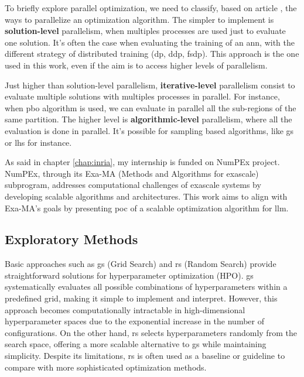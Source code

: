 To briefly explore parallel optimization, we need to classify, based on article \cite{kacprzyk_parallel_2015}, the ways to parallelize an optimization algorithm. The simpler to implement is \textbf{solution-level} parallelism, when multiples processes are used just to evaluate one solution. It's often the case when evaluating the training of an \acrshort{ann}, with the different strategy of distributed training (\acrfull{dp}, \acrfull{ddp}, \acrfull{fsdp}). This approach is the one used in this work, even if the aim is to access higher levels of parallelism.

Just higher than solution-level parallelism, \textbf{iterative-level} parallelism consist to evaluate multiple solutions with multiples processes in parallel. For instance, when \acrshort{pbo} algorithm is used, we can evaluate in parallel all the sub-regions of the same partition. The higher level is \textbf{algorithmic-level} parallelism, where all the evaluation is done in parallel. It's possible for sampling based algorithms, like \acrshort{gs} or \acrshort{lhs} for instance.

As said in chapter \ref{chap:inria}, my internship is funded on NumPEx project. NumPEx, through its Exa-MA (Methods and Algorithms for \Gls{exascale}) subprogram, addresses computational challenges of \gls{exascale} systems by developing scalable algorithms and architectures. This work aims to align with Exa-MA's goals by presenting \acrlong{poc} of a scalable optimization algorithm for \acrshort{llm}.

\subsection{Exploratory Methods} 
\label{sec:expl}
Basic approaches such as \acrfull{gs} (Grid Search) and \acrfull{rs} (Random Search) provide straightforward solutions for hyperparameter optimization (HPO). \acrshort{gs} systematically evaluates all possible combinations of hyperparameters within a predefined grid, making it simple to implement and interpret. However, this approach becomes computationally intractable in high-dimensional hyperparameter spaces due to the exponential increase in the number of configurations. On the other hand, \acrshort{rs} selects hyperparameters randomly from the search space, offering a more scalable alternative to \acrshort{gs} while maintaining simplicity. Despite its limitations, \acrshort{rs} is often used as a baseline or guideline to compare with more sophisticated optimization methods.



